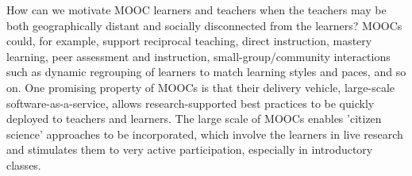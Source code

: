 How can we motivate MOOC learners and teachers when the teachers may be
both geographically distant and socially disconnected from the learners?
MOOCs could, for example, support reciprocal teaching, direct
instruction, mastery learning, peer assessment and instruction,
small-group/community interactions such as dynamic regrouping of
learners to match learning styles and paces, and so on.
One promising property of MOOCs is that their delivery vehicle,
large-scale software-as-a-service, allows research-supported best
practices to be quickly deployed to
teachers and learners.
The large scale of MOOCs enables 'citizen science' approaches to be incorporated, which involve the
learners in live research and stimulates them to very active participation, especially in
introductory classes.

